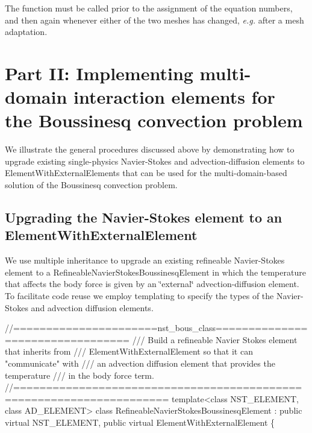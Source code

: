 The function must be called prior to the assignment of the equation numbers, and then again whenever either of the two meshes has changed, {\itshape  e.\+g.} after a mesh adaptation.



 

\hypertarget{index_implement_boussinesq}{}\section{Part I\+I\+: Implementing multi-\/domain interaction elements for the Boussinesq convection problem}\label{index_implement_boussinesq}
We illustrate the general procedures discussed above by demonstrating how to upgrade existing single-\/physics Navier-\/\+Stokes and advection-\/diffusion elements to {\ttfamily Element\+With\+External\+Elements} that can be used for the multi-\/domain-\/based solution of the Boussinesq convection problem.



\hypertarget{index_nst}{}\subsection{Upgrading the Navier-\/\+Stokes element to an Element\+With\+External\+Element}\label{index_nst}
We use multiple inheritance to upgrade an existing refineable Navier-\/\+Stokes element to a {\ttfamily Refineable\+Navier\+Stokes\+Boussinesq\+Element} in which the temperature that affects the body force is given by an \char`\"{}external\char`\"{} advection-\/diffusion element. To facilitate code reuse we employ templating to specify the types of the Navier-\/\+Stokes and advection diffusion elements.

 
\begin{DoxyCodeInclude}
\textcolor{comment}{//======================nst\_bous\_class=================================}
\textcolor{comment}{/// Build a refineable Navier Stokes element that inherits from }
\textcolor{comment}{}\textcolor{comment}{/// ElementWithExternalElement so that it can "communicate" with }
\textcolor{comment}{}\textcolor{comment}{/// an advection diffusion element that provides the temperature}
\textcolor{comment}{}\textcolor{comment}{/// in the body force term.}
\textcolor{comment}{}\textcolor{comment}{//=====================================================================}
\textcolor{keyword}{template}<\textcolor{keyword}{class} NST\_ELEMENT, \textcolor{keyword}{class} AD\_ELEMENT>
\textcolor{keyword}{class }RefineableNavierStokesBoussinesqElement : \textcolor{keyword}{public} \textcolor{keyword}{virtual} NST\_ELEMENT,
\textcolor{keyword}{public} \textcolor{keyword}{virtual} ElementWithExternalElement
\{

\end{DoxyCodeInclude}



